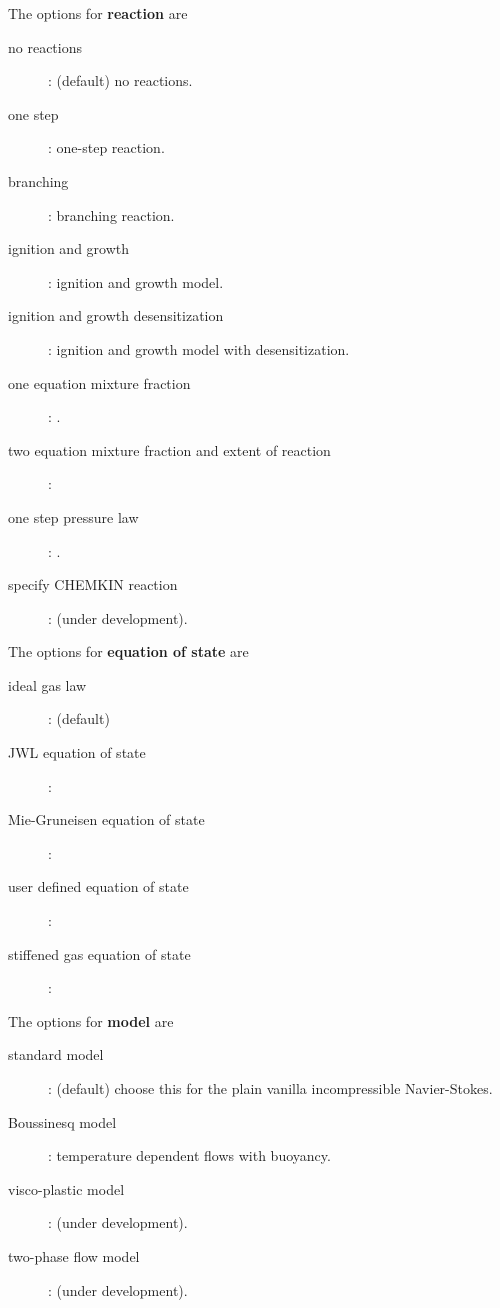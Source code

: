 \documentclass{article}
\begin{document}
\noindent The options for {\bf reaction} are
\begin{description}
  \item[\qquad no reactions] : (default) no reactions.
  \item[\qquad one step] : one-step reaction.
  \item[\qquad branching] : branching reaction.
  \item[\qquad ignition and growth] : ignition and growth model.
  \item[\qquad ignition and growth desensitization] : ignition and growth model with desensitization.
  \item[\qquad one equation mixture fraction] : .
  \item[\qquad two equation mixture fraction and extent of reaction] :
  \item[\qquad one step pressure law] : .
  \item[\qquad specify CHEMKIN reaction] : (under development). 
\end{description}

\noindent The options for {\bf equation of state} are
\begin{description}
  \item[\qquad ideal gas law] : (default) 
  \item[\qquad JWL equation of state] : 
  \item[\qquad Mie-Gruneisen equation of state] : 
  \item[\qquad user defined equation of state] : 
  \item[\qquad stiffened gas equation of state] : 
\end{description}


\noindent The options for {\bf model} are
\begin{description}
  \item[\qquad standard model] : (default) choose this for the plain vanilla incompressible Navier-Stokes. 
  \item[\qquad Boussinesq model] : temperature dependent flows with buoyancy. 
  \item[\qquad visco-plastic model] : (under development). 
  \item[\qquad two-phase flow model] : (under development). 
\end{description}
\end{document}
